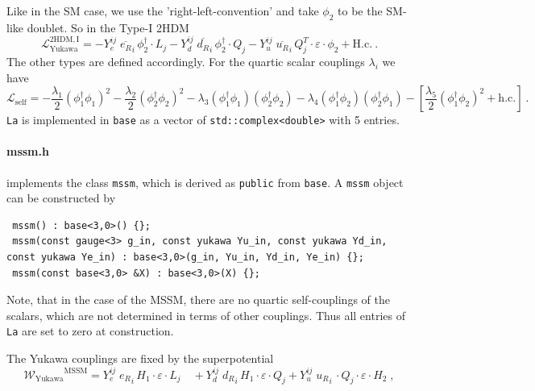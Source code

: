 \documentclass[11pt,a4paper]{article}
\begin{document}
Like in the SM case, we use the 'right-left-convention' and take $\phi_2$ to be the SM-like doublet. So in the Type-I 2HDM
\begin{equation} \label{eq:thdm_yuk}
    \mathcal{L}_{\mathrm{Yukawa}}^{\mathrm{2HDM,I}} = - Y_e^{ij}\; \overline{e_{R}}_{i} \, \phi_2^\dagger \cdot L_j
  - Y_d^{ij}\; \overline{d_{R}}_{i} \, \phi_2^\dagger \cdot Q_j
  - Y_u^{ij}\; \overline{u_{R}}_{i} \, Q_j^T \cdot \varepsilon \cdot \phi_2 + \mathrm{H.c.}~.
\end{equation}
The other types are defined accordingly. For the quartic scalar couplings $\lambda_i$ we have
\begin{equation} \label{eq:thdm_la}
  \mathcal{L}_{\mathrm{self}} = -\frac{\lambda_1}{2} (\phi_1^\dagger\phi_1)^2 -\frac{\lambda_2}{2} (\phi_2^\dagger\phi_2)^2 - \lambda_3(\phi_1^\dagger\phi_1)(\phi_2^\dagger\phi_2) - \lambda_4(\phi_1^\dagger\phi_2)(\phi_2^\dagger\phi_1)
                                -\left[\frac{\lambda_5}{2} (\phi_1^\dagger\phi_2)^2 + \mathrm{h.c.}\right]~.
\end{equation}
\texttt{La} is implemented in \texttt{base} as a vector of \texttt{std::complex<double>} with 5 entries.

\paragraph{mssm.h}
implements the class \texttt{mssm}, which is derived as \texttt{public} from \texttt{base}. A \texttt{mssm} object can be constructed by
\begin{lstlisting}
 mssm() : base<3,0>() {};
 mssm(const gauge<3> g_in, const yukawa Yu_in, const yukawa Yd_in, const yukawa Ye_in) : base<3,0>(g_in, Yu_in, Yd_in, Ye_in) {};
 mssm(const base<3,0> &X) : base<3,0>(X) {};
\end{lstlisting}
Note, that in the case of the MSSM, there are no quartic self-couplings of the scalars, which are not determined in terms of other couplings.
Thus all entries of \texttt{La} are set to zero at construction.

The Yukawa couplings are fixed by the superpotential
\begin{equation} \label{eq:mssm_yuk}
  \mathcal{W_\mathrm{Yukawa}}^{\mathrm{MSSM}} = Y_e^{ij} \; {e_R}_i\, H_1\cdot \varepsilon \cdot L_j \quad + Y_d^{ij} \; {d_R}_i \, H_1\cdot \varepsilon \cdot Q_j + Y_u^{ij} \; {u_R}_i \, \cdot Q_j\cdot \varepsilon \cdot H_2 \;,
\end{equation} 
\end{document}
